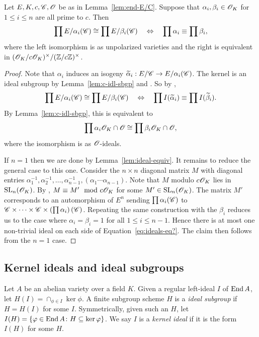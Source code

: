 \documentclass{amsart}
\begin{document}
\begin{lemma}\label{lem:prod-equiv-torsor}
  Let $E,K,c,\mathscr{C},\mathscr{O}$ be as in Lemma~\ref{lem:end-E/C}. Suppose that $\alpha_i,\beta_i \in \mathscr{O}_K$ for $1 \leq i \leq n$ are all prime to $c$. Then
  \[
    \prod E/\alpha_i(\mathscr{C}) \cong \prod E/\beta_i(\mathscr{C})
    \quad\Leftrightarrow\quad
    \prod \alpha_i \equiv \prod \beta_i,
  \]
  where the left isomorphism is as unpolarized varieties and the right is equivalent in $(\mathscr{O}_K/c\mathscr{O}_K)^\times/(\mathbb{Z}/c\mathbb{Z})^\times$.
\end{lemma}
\begin{proof}
  Note that $\alpha_i$ induces an isogeny $\widetilde{\alpha}_i: E/\mathscr{C} \to E/\alpha_i(\mathscr{C})$. The kernel is an ideal subgroup by Lemma~\ref{lem:c-idl-sbgp} and \cite[Thm.~20b]{kani2011products}. So by \cite[Rem.~49]{kani2011products},
  \[
    \prod E/\alpha_i(\mathscr{C}) \cong \prod E/\beta_i(\mathscr{C})
    \quad\Leftrightarrow\quad
    \prod I(\widetilde{\alpha}_i) \equiv \prod I(\widetilde{\beta}_i).
  \]
  By Lemma~\ref{lem:c-idl-sbgp}, this is equivalent to
  \begin{equation}\label{eq:ideals-eq?}
    \prod \alpha_i\mathscr{O}_K \cap \mathscr{O} \cong \prod \beta_i\mathscr{O}_K \cap \mathscr{O},
  \end{equation}
  where the isomorphism is as $\mathscr{O}$-ideals.

  If $n = 1$ then we are done by Lemma~\ref{lem:ideal-equiv}. It remains to reduce the general case to this one. Consider the $n \times n$ diagonal matrix $M$ with diagonal entries $\alpha_1^{-1},\alpha_2^{-1},\dots,\alpha_{n-1}^{-1}, (\alpha_1 \cdots \alpha_{n-1})$. Note that $M$ modulo $c\mathscr{O}_K$ lies in $\operatorname{SL}_n(\mathscr{O}_K)$. By \cite[Cor.~5.2, Pg.~18]{ktheory1964bass}, $M \equiv M' \mod{c\mathscr{O}_K}$ for some $M' \in \operatorname{SL}_n(\mathscr{O}_K)$. The matrix $M'$ corresponds to an automorphism of $E^n$ sending $\prod \alpha_i(\mathscr{C})$ to $\mathscr{C} \times \cdots \times \mathscr{C} \times \left(\prod \alpha_i\right)(\mathscr{C})$. Repeating the same construction with the $\beta_i$ reduces us to the case where $\alpha_i = \beta_i = 1$ for all $1 \leq i \leq n-1$. Hence there is at most one non-trivial ideal on each side of Equation~\ref{eq:ideals-eq?}. The claim then follows from the $n=1$ case.
\end{proof}

\subsection{Kernel ideals and ideal subgroups}\label{sec:kani}

\begin{definition}
  Let $A$ be an abelian variety over a field $K$. Given a regular left-ideal $I$ of $\operatorname{End} A$, let $H(I) = \cap_{\phi \in I}\ker \phi$. A finite subgroup scheme $H$ is a \emph{ideal subgroup} if $H = H(I)$ for some $I$. Symmetrically, given such an $H$, let $I(H) = \{\varphi \in \operatorname{End} A \colon H \subseteq \ker\varphi\}$. We say $I$ is a \emph{kernel ideal} if it is the form $I(H)$ for some $H$.
\end{definition}
\end{document}
